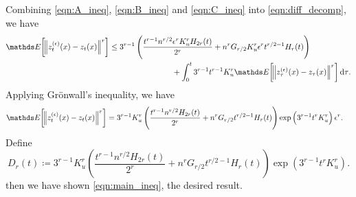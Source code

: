 Combining \eqref{eqn:A_ineq}, \eqref{eqn:B_ineq} and \eqref{eqn:C_ineq} into \eqref{eqn:diff_decomp}, we have
\begin{align*}
	\avg{\norm{z_t^{(\epsilon)}(x) - z_t(x)}^r} %
	 & \leq 3^{r-1}\left(\frac{t^{r-1}n^{r/2}\epsilon^{r}K_u^rH_{2r}(t)}{2^r} + n^{r}G_{r/2}K_u^r \epsilon^r t^{r/2 - 1}H_{r}(t)\right) \\
	 & \qquad\qquad\qquad\qquad + \int_0^t{3^{r-1}t^{r-1}K_u^r\avg{\norm{z_\tau^{(\epsilon)}(x) - z_\tau(x)}^r}\dif\tau}.
\end{align*}
Applying Gr\"{o}nwall's inequality, we have
\begin{align*}
	\avg{\norm{z_t^{(\epsilon)}(x) - z_t(x)}^r} %
	 & = 3^{r-1}K_u^r\left(\frac{t^{r-1}n^{r/2}H_{2r}(t)}{2^r} + n^{r}G_{r/2}t^{r/2 - 1}H_{r}(t)\right)\exp\left(3^{r - 1}t^{r}K_u^r\right)\epsilon^r.
\end{align*}
Define
\begin{equation*}
	D_r(t) \coloneqq 3^{r-1}K_u^r\left(\frac{t^{r-1}n^{r/2}H_{2r}(t)}{2^r} + n^{r}G_{r/2}t^{r/2 - 1}H_{r}(t)\right)\exp\left(3^{r - 1}t^{r}K_u^r\right).
\end{equation*}
then we have shown \eqref{eqn:main_ineq}, the desired result.

